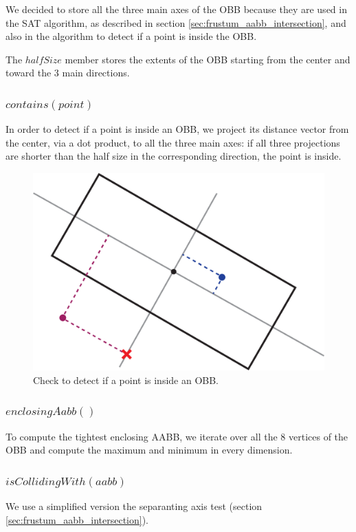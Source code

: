 \documentclass{PoliMi_MasterThesis}
\begin{document}
We decided to store all the three main axes of the OBB because they are used in the SAT algorithm, as described in section \ref{sec:frustum_aabb_intersection}, and also in the algorithm to detect if a point is inside the OBB.

The $halfSize$ member stores the extents of the OBB starting from the center and toward the 3 main directions.

\subsubsection*{$contains(point)$}
In order to detect if a point is inside an OBB, we project its distance vector from the center, via a dot product, to all the three main axes: if all three projections are shorter than the half size in the corresponding direction, the point is inside.

\begin{figure}[H]
    \centering
    \includegraphics[width=\textwidth*\real{0.5}]{Images/point_obb_test.png}
    \caption{Check to detect if a point is inside an OBB.}
    \label{fig:oobb_contains}
\end{figure}

\subsubsection*{$enclosingAabb()$}
To compute the tightest enclosing AABB, we iterate over all the 8 vertices of the OBB and compute the maximum and minimum in every dimension.

\subsubsection*{$isCollidingWith(aabb)$}
We use a simplified version the separanting axis test (section \ref{sec:frustum_aabb_intersection}).
\end{document}
